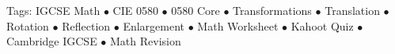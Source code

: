 \documentclass[11pt,a4paper]{article}
\begin{document}
\vspace{14pt}
\begin{center}
  \sffamily\scriptsize\textcolor{textmuted}{
    Tags: IGCSE Math $\bullet$ CIE 0580 $\bullet$ 0580 Core $\bullet$ Transformations $\bullet$ Translation $\bullet$ Rotation $\bullet$ Reflection $\bullet$ Enlargement $\bullet$ Math Worksheet $\bullet$ Kahoot Quiz $\bullet$ Cambridge IGCSE $\bullet$ Math Revision
  }
\end{center}
\end{document}
